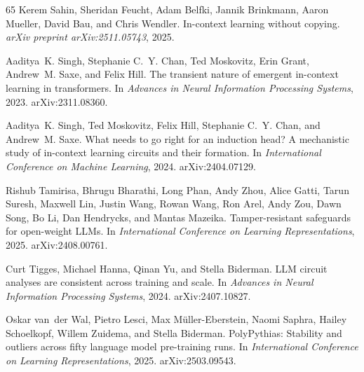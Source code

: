 \begin{thebibliography}{65}
Kerem Sahin, Sheridan Feucht, Adam Belfki, Jannik Brinkmann, Aaron Mueller, David Bau, and Chris Wendler.
\newblock In-context learning without copying.
\newblock \emph{arXiv preprint arXiv:2511.05743}, 2025.

Aaditya~K. Singh, Stephanie C.~Y. Chan, Ted Moskovitz, Erin Grant, Andrew~M. Saxe, and Felix Hill.
\newblock The transient nature of emergent in-context learning in transformers.
\newblock In \emph{Advances in Neural Information Processing Systems}, 2023.
\newblock arXiv:2311.08360.

Aaditya~K. Singh, Ted Moskovitz, Felix Hill, Stephanie C.~Y. Chan, and
  Andrew~M. Saxe.
\newblock What needs to go right for an induction head? A mechanistic study of
  in-context learning circuits and their formation.
\newblock In \emph{International Conference on Machine Learning}, 2024.
\newblock arXiv:2404.07129.

Rishub Tamirisa, Bhrugu Bharathi, Long Phan, Andy Zhou, Alice Gatti, Tarun Suresh, Maxwell Lin, Justin Wang, Rowan Wang, Ron Arel, Andy Zou, Dawn Song, Bo Li, Dan Hendrycks, and Mantas Mazeika.
\newblock Tamper-resistant safeguards for open-weight LLMs.
\newblock In \emph{International Conference on Learning Representations}, 2025.
\newblock arXiv:2408.00761.

Curt Tigges, Michael Hanna, Qinan Yu, and Stella Biderman.
\newblock LLM circuit analyses are consistent across training and scale.
\newblock In \emph{Advances in Neural Information Processing Systems}, 2024.
\newblock arXiv:2407.10827.

Oskar van~der Wal, Pietro Lesci, Max M{\"u}ller-Eberstein, Naomi Saphra, Hailey Schoelkopf, Willem Zuidema, and Stella Biderman.
\newblock PolyPythias: Stability and outliers across fifty language model pre-training runs.
\newblock In \emph{International Conference on Learning Representations}, 2025.
\newblock arXiv:2503.09543.


\end{thebibliography}
